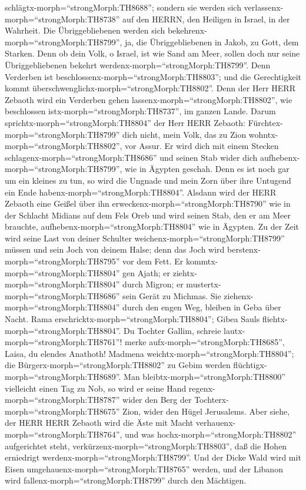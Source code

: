 schlägtx-morph=``strongMorph:TH8688''; sondern sie werden sich
verlassenx-morph=``strongMorph:TH8738'' auf den HERRN, den Heiligen in
Israel, in der Wahrheit.  Die Übriggebliebenen werden sich
bekehrenx-morph=``strongMorph:TH8799'', ja, die Übriggebliebenen in
Jakob, zu Gott, dem Starken.  Denn ob dein Volk, o Israel,
ist wie Sand am Meer, sollen doch nur seine Übriggebliebenen bekehrt
werdenx-morph=``strongMorph:TH8799''. Denn Verderben ist
beschlossenx-morph=``strongMorph:TH8803''; und die Gerechtigkeit kommt
überschwenglichx-morph=``strongMorph:TH8802''.  Denn der
Herr HERR Zebaoth wird ein Verderben gehen
lassenx-morph=``strongMorph:TH8802'', wie beschlossen
istx-morph=``strongMorph:TH8737'', im ganzen Lande.  Darum
sprichtx-morph=``strongMorph:TH8804'' der Herr HERR Zebaoth:
Fürchtex-morph=``strongMorph:TH8799'' dich nicht, mein Volk, das zu Zion
wohntx-morph=``strongMorph:TH8802'', vor Assur. Er wird dich mit einem
Stecken schlagenx-morph=``strongMorph:TH8686'' und seinen Stab wider
dich aufhebenx-morph=``strongMorph:TH8799'', wie in Ägypten geschah.
 Denn es ist noch gar um ein kleines zu tun, so wird die
Ungnade und mein Zorn über ihre Untugend ein Ende
habenx-morph=``strongMorph:TH8804''.  Alsdann wird der HERR
Zebaoth eine Geißel über ihn erweckenx-morph=``strongMorph:TH8790'' wie
in der Schlacht Midians auf dem Fels Oreb und wird seinen Stab, den er
am Meer brauchte, aufhebenx-morph=``strongMorph:TH8804'' wie in Ägypten.
 Zu der Zeit wird seine Last von deiner Schulter
weichenx-morph=``strongMorph:TH8799'' müssen und sein Joch von deinem
Halse; denn das Joch wird berstenx-morph=``strongMorph:TH8795'' vor dem
Fett.  Er kommtx-morph=``strongMorph:TH8804'' gen Ajath; er
ziehtx-morph=``strongMorph:TH8804'' durch Migron; er
mustertx-morph=``strongMorph:TH8686'' sein Gerät zu Michmas.
 Sie ziehenx-morph=``strongMorph:TH8804'' durch den engen
Weg, bleiben in Geba über Nacht. Rama
erschricktx-morph=``strongMorph:TH8804''; Gibea Sauls
fliehtx-morph=``strongMorph:TH8804''.  Du Tochter Gallim,
schreie lautx-morph=``strongMorph:TH8761''! merke
aufx-morph=``strongMorph:TH8685'', Laisa, du elendes Anathoth!
 Madmena weichtx-morph=``strongMorph:TH8804''; die
Bürgerx-morph=``strongMorph:TH8802'' zu Gebim werden
flüchtigx-morph=``strongMorph:TH8689''.  Man
bleibtx-morph=``strongMorph:TH8800'' vielleicht einen Tag zu Nob, so
wird er seine Hand regenx-morph=``strongMorph:TH8787'' wider den Berg
der Tochterx-morph=``strongMorph:TH8675'' Zion, wider den Hügel
Jerusalems.  Aber siehe, der HERR HERR Zebaoth wird die
Äste mit Macht verhauenx-morph=``strongMorph:TH8764'', und was
hochx-morph=``strongMorph:TH8802'' aufgerichtet steht,
verkürzenx-morph=``strongMorph:TH8803'', daß die Hohen erniedrigt
werdenx-morph=``strongMorph:TH8799''.  Und der Dicke Wald
wird mit Eisen umgehauenx-morph=``strongMorph:TH8765'' werden, und der
Libanon wird fallenx-morph=``strongMorph:TH8799'' durch den Mächtigen.

